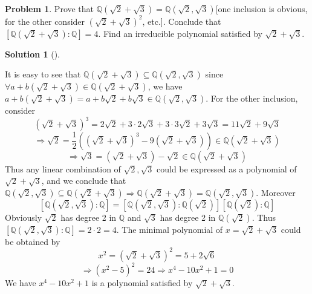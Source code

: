 \documentclass{article}
\theoremstyle{definition}
\newtheorem{prob}{Problem}
\newtheorem*{sol}{Solution}
\newenvironment{sols}[1][]{%
  \begin{sol}[#1]$ $\par\nobreak\ignorespaces
}{%
  \end{sol}
}
\begin{document}
\setcounter{prob}{6}
\begin{prob}
	Prove that $\mathbb{Q}(\sqrt{2} + \sqrt{3}) = \mathbb{Q}(\sqrt{2}, \sqrt{3})$[one inclusion is obvious, for the other consider $(\sqrt{2} + \sqrt{3})^2$, etc.]. 
	Conclude that $[\mathbb{Q}(\sqrt{2} + \sqrt{3}) : \mathbb{Q}] = 4$.
	Find an irreducible polynomial satisfied by $\sqrt{2} + \sqrt{3}$.
\end{prob}

\begin{sols}
	It is easy to see that $\mathbb{Q}(\sqrt{2} + \sqrt{3}) \subseteq \mathbb{Q}(\sqrt{2}, \sqrt{3})$ since $\forall a + b(\sqrt{2} + \sqrt{3}) \in \mathbb{Q}(\sqrt{2} + \sqrt{3})$, we have $a + b(\sqrt{2} + \sqrt{3}) = a + b\sqrt{2} + b\sqrt{3} \in \mathbb{Q}(\sqrt{2}, \sqrt{3})$.
	For the other inclusion, consider
	\[
		(\sqrt{2} + \sqrt{3})^3 = 2 \sqrt{2} + 3 \cdot 2 \sqrt{3} + 3 \cdot 3 \sqrt{2} + 3 \sqrt{3} = 11\sqrt{2} + 9 \sqrt{3}
	\]
	\[
		\Rightarrow \sqrt{2} = \frac{1}{2} ((\sqrt{2} + \sqrt{3})^3 - 9 (\sqrt{2} + \sqrt{3})) \in \mathbb{Q}(\sqrt{2} + \sqrt{3}) 
	\]
	\[
		\Rightarrow \sqrt{3} = (\sqrt{2} + \sqrt{3}) - \sqrt{2} \in \mathbb{Q}(\sqrt{2} + \sqrt{3})
	\]
	Thus any linear combination of $\sqrt{2}, \sqrt{3}$ could be expressed as a polynomial of $\sqrt{2} + \sqrt{3}$, and we conclude that $\mathbb{Q}(\sqrt{2}, \sqrt{3}) \subseteq \mathbb{Q}(\sqrt{2} + \sqrt{3}) \Rightarrow \mathbb{Q}(\sqrt{2} + \sqrt{3}) = \mathbb{Q}(\sqrt{2}, \sqrt{3})$.
	Moreover 
	\[
		[\mathbb{Q}(\sqrt{2}, \sqrt{3}):\mathbb{Q}] = [\mathbb{Q}(\sqrt{2}, \sqrt{3}):\mathbb{Q}(\sqrt{2})][\mathbb{Q}(\sqrt{2}):\mathbb{Q}]
	\]
	Obviously $\sqrt{2}$ has degree 2 in $\mathbb{Q}$ and $\sqrt{3}$ has degree 2 in $\mathbb{Q}(\sqrt{2})$.
	Thus $[\mathbb{Q}(\sqrt{2}, \sqrt{3}):\mathbb{Q}] = 2 \cdot 2 = 4$.
	The minimal polynomial of $x = \sqrt{2} + \sqrt{3}$ could be obtained by
	\[
		x^2 = (\sqrt{2} + \sqrt{3})^2 = 5 + 2 \sqrt{6}
	\]
	\[
		\Rightarrow (x^2 - 5)^2 = 24 \Rightarrow x^4 - 10 x^2 + 1 = 0
	\]
	We have $x^4 - 10x^2 + 1$ is a polynomial satisfied by $\sqrt{2} + \sqrt{3}$.
\end{sols}
\end{document}
